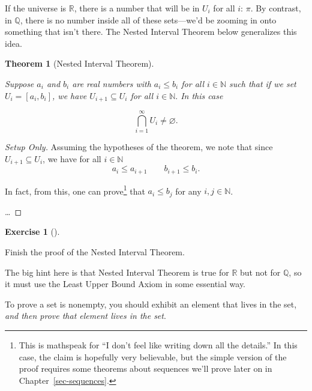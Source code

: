 \documentclass[
  letterpaper,
  DIV=11,
  numbers=noendperiod]{scrreprt}
\def\R{\mathbb R}
\def\N{\mathbb N}
\def\Q{\mathbb Q}
\theoremstyle{plain}
\newtheorem{theorem}{Theorem}[chapter]
\theoremstyle{definition}
\newtheorem{exercise}{Exercise}[chapter]
\theoremstyle{plain}
\theoremstyle{plain}
\theoremstyle{definition}
\theoremstyle{definition}
\theoremstyle{remark}
\begin{document}
If the universe is \(\R\), there is a number that will be in \(U_i\) for
all \(i\): \(\pi\). By contrast, in \(\Q\), there is no number inside
all of these sets---we'd be zooming in onto something that isn't there.
The Nested Interval Theorem below generalizes this idea.

\begin{theorem}[Nested Interval
Theorem]\protect\hypertarget{thm-NIT}{}\label{thm-NIT}

Suppose \(a_i\) and \(b_i\) are real numbers with \(a_i\leq b_i\) for
all \(i\in\N\) such that if we set \(U_i=[a_i,b_i]\), we have
\(U_{i+1}\subseteq U_i\) for all \(i\in\N.\) In this case

\[\bigcap_{i=1}^\infty U_i \neq \varnothing.\]

\end{theorem}

\begin{proof}[Setup Only]
Assuming the hypotheses of the theorem, we note that since
\(U_{i+1}\subseteq U_i\), we have for all \(i\in\N\)
\[a_i\leq a_{i+1} \qquad b_{i+1}\leq b_i.\]

In fact, from this, one can prove\footnote{This is mathspeak for ``I
  don't feel like writing down all the details.'' In this case, the
  claim is hopefully very believable, but the simple version of the
  proof requires some theorems about sequences we'll prove later on in
  Chapter~\ref{sec-sequences}.} that \(a_i\leq b_j\) for any
\(i,j\in\N\).

\ldots{}
\end{proof}

\begin{exercise}[]\protect\hypertarget{exr-finish-nit-proof}{}\label{exr-finish-nit-proof}

Finish the proof of the Nested Interval Theorem.

The big hint here is that Nested Interval Theorem is true for \(\R\) but
not for \(\Q\), so it must use the Least Upper Bound Axiom in some
essential way.

\end{exercise}

\begin{tcolorbox}[enhanced jigsaw, titlerule=0mm, opacitybacktitle=0.6, leftrule=.75mm, bottomrule=.15mm, left=2mm, arc=.35mm, colback=white, rightrule=.15mm, colframe=quarto-callout-tip-color-frame, toptitle=1mm, breakable, opacityback=0, colbacktitle=quarto-callout-tip-color!10!white, bottomtitle=1mm, title=\textcolor{quarto-callout-tip-color}{\faLightbulb}\hspace{0.5em}{Hint}, coltitle=black, toprule=.15mm]

To prove a set is nonempty, you should exhibit an element that lives in
the set, \emph{and then prove that element lives in the set}.

\end{tcolorbox}
\end{document}
